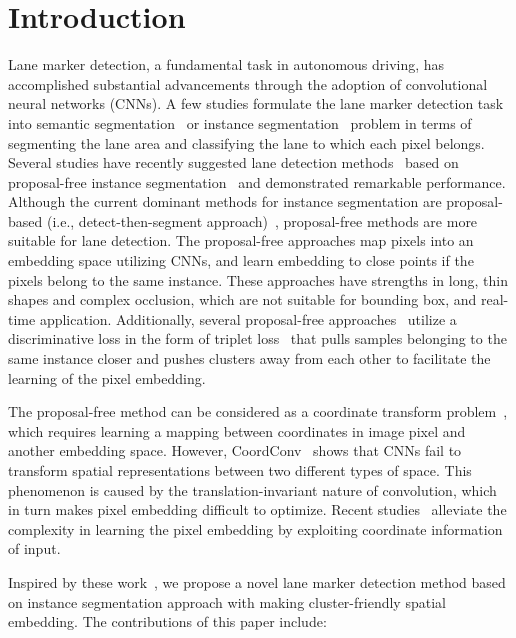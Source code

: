 \documentclass[runningheads]{llncs}
\begin{document}
\vspace*{-0.8cm}
\section{Introduction}
\vspace*{-0.3cm}
Lane marker detection, a fundamental task in autonomous driving, has accomplished substantial advancements through the adoption of convolutional neural networks (CNNs). A few studies formulate the lane marker detection task into semantic segmentation~\cite{chen2018encoder} or instance segmentation~\cite{he2017mask,neven2019instance} problem in terms of segmenting the lane area and classifying the lane to which each pixel belongs. 
Several studies have recently suggested lane detection methods~\cite{hsu2018learning,neven2018towards} based on proposal-free instance segmentation~\cite{neven2019instance,de2017semantic} and demonstrated remarkable performance.
Although the current dominant methods for instance segmentation are proposal-based (i.e., detect-then-segment approach)~\cite{he2017mask},
proposal-free methods are more suitable for lane detection. The proposal-free approaches map pixels into an embedding space utilizing CNNs, and learn embedding to close points if the pixels belong to the same instance. 
These approaches have strengths in long, thin shapes and complex occlusion, which are not suitable for bounding box, and real-time application.
Additionally, several proposal-free approaches~\cite{de2017semantic,neven2018towards} utilize a discriminative loss in the form of triplet loss~\cite{Schroff_2015_CVPR} that pulls samples belonging to the same instance closer and pushes clusters away from each other to facilitate the learning of the pixel embedding.

The proposal-free method can be considered as a coordinate transform problem~\cite{liu2018intriguing}, which requires learning a mapping between coordinates in image pixel and another embedding space. However, CoordConv~\cite{liu2018intriguing} shows that CNNs fail to transform spatial representations between two different types of space. This phenomenon is caused by the translation-invariant nature of convolution, which in turn makes pixel embedding difficult to optimize. Recent studies~\cite{liu2018intriguing,neven2019instance} alleviate the complexity in learning the pixel embedding by exploiting coordinate information of input.

Inspired by these work~\cite{liu2018intriguing,neven2019instance,de2017semantic,neven2018towards}, we propose a novel lane marker detection method based on instance segmentation approach with making cluster-friendly spatial embedding. The contributions of this paper include:
\end{document}
